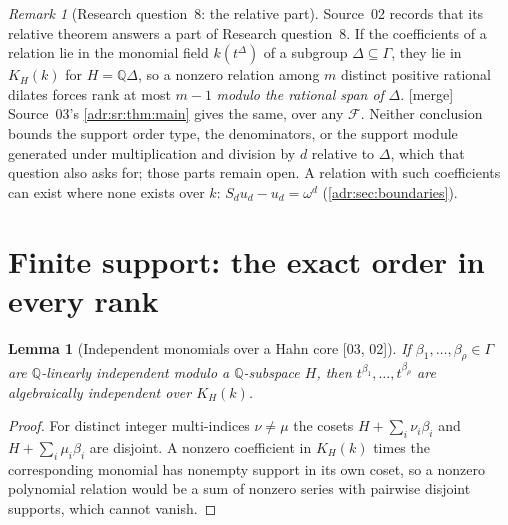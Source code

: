 \documentclass[11pt,letterpaper]{article}
\numberwithin{equation}{section}
\newtheorem{lemma}[lemma]{Lemma}
\theoremstyle{definition}
\theoremstyle{remark}
\newtheorem{remark}[remark]{Remark}
\newcommand{\Q}{\mathbb Q}
\newcommand{\mtag}{\textup{[merge]}}%
\newcommand{\src}[1]{\textup{[#1]}}%
\begin{document}
\begin{remark}[Research question~8: the relative part]
\label{adr:sr:rem:question-eight}
Source~02 records that its relative theorem answers a part of Research
question~8. If the coefficients of a relation lie in the monomial field
$k(t^\Delta)$ of a subgroup $\Delta\subseteq\Gamma$, they lie in $K_H(k)$ for
$H=\Q\Delta$, so a nonzero relation among $m$ distinct positive rational
dilates forces rank at most $m-1$ \emph{modulo the rational span of} $\Delta$.
\mtag{} Source~03's \cref{adr:sr:thm:main} gives the same, over any
$\mathcal F$. Neither conclusion bounds the support order type, the
denominators, or the support module generated under multiplication and
division by $d$ relative to $\Delta$, which that question also asks for; those
parts remain open. A relation with such coefficients can exist where none
exists over $k$: $S_du_d-u_d=\omega^d$ (\cref{adr:sec:boundaries}).
\end{remark}

\section{Finite support: the exact order in every rank}
\label{adr:sr:sec:finite}

\begin{lemma}[Independent monomials over a Hahn core \src{03, 02}]
\label{adr:sr:lem:monomials}
If $\beta_1,\ldots,\beta_\rho\in\Gamma$ are $\Q$-linearly independent modulo a
$\Q$-subspace $H$, then $t^{\beta_1},\ldots,t^{\beta_\rho}$ are algebraically
independent over $K_H(k)$.
\end{lemma}
\begin{proof}
For distinct integer multi-indices $\nu\ne\mu$ the cosets
$H+\sum_i\nu_i\beta_i$ and $H+\sum_i\mu_i\beta_i$ are disjoint. A nonzero
coefficient in $K_H(k)$ times the corresponding monomial has nonempty support
in its own coset, so a nonzero polynomial relation would be a sum of nonzero
series with pairwise disjoint supports, which cannot vanish.
\end{proof}
\end{document}
